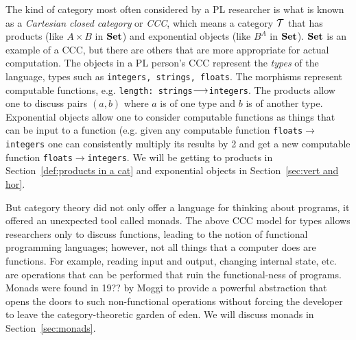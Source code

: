 \documentclass[CT4S-EN-RU]{subfiles}
\begin{document}
\begin{blockRUS}
\end{blockRUS}

\begin{blockENG}
The kind of category most often considered by a PL researcher is what is known as a {\em Cartesian closed category} or {\em CCC}, which means a category $\mathcal{T}$ that has products (like $A\times B$ in ${\mathbf{Set}}$) and exponential objects (like $B^A$ in ${\mathbf{Set}}$). ${\mathbf{Set}}$ is an example of a CCC, but there are others that are more appropriate for actual computation. The objects in a PL person's CCC represent the {\em types} of the language, types such as {\tt integers, strings, floats}. The morphisms represent computable functions, e.g. {\tt length: strings}$\longrightarrow${\tt integers}. The products allow one to discuss pairs $(a,b)$ where $a$ is of one type and $b$ is of another type. Exponential objects allow one to consider computable functions as things that can be input to a function (e.g. given any computable function {\tt floats}$\to${\tt integers} one can consistently multiply its results by 2 and get a new computable function {\tt floats}$\to${\tt integers}. We will be getting to products in Section~\ref{def:products in a cat} and exponential objects in Section~\ref{sec:vert and hor}. 
\end{blockENG}

\begin{blockRUS}
\end{blockRUS}

\begin{blockENG}
But category theory did not only offer a language for thinking about programs, it offered an unexpected tool called monads. The above CCC model for types allows researchers only to discuss functions, leading to the notion of functional programming languages; however, not all things that a computer does are functions. For example, reading input and output, changing internal state, etc. are operations that can be performed that ruin the functional-ness of programs. Monads were found in 19?? by Moggi \cite{Mog} to provide a powerful abstraction that opens the doors to such non-functional operations without forcing the developer to leave the category-theoretic garden of eden. We will discuss monads in Section~\ref{sec:monads}.
\end{blockENG}

\begin{blockRUS}
\end{blockRUS}
\end{document}
